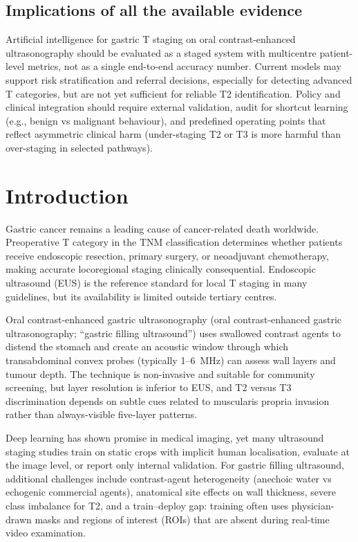 \documentclass[11pt,a4paper]{article}
\begin{document}
\subsection*{Implications of all the available evidence}
Artificial intelligence for gastric T staging on oral contrast-enhanced ultrasonography should be evaluated as a staged system with multicentre patient-level metrics, not as a single end-to-end accuracy number. Current models may support risk stratification and referral decisions, especially for detecting advanced T categories, but are not yet sufficient for reliable T2 identification. Policy and clinical integration should require external validation, audit for shortcut learning (e.g., benign vs malignant behaviour), and predefined operating points that reflect asymmetric clinical harm (under-staging T2 or T3 is more harmful than over-staging in selected pathways).

\section{Introduction}
Gastric cancer remains a leading cause of cancer-related death worldwide. Preoperative T category in the TNM classification determines whether patients receive endoscopic resection, primary surgery, or neoadjuvant chemotherapy, making accurate locoregional staging clinically consequential.\cite{ajcc8,china_gastric_guideline2022} Endoscopic ultrasound (EUS) is the reference standard for local T staging in many guidelines, but its availability is limited outside tertiary centres.\cite{eus_staging_review}

Oral contrast-enhanced gastric ultrasonography (oral contrast-enhanced gastric ultrasonography; ``gastric filling ultrasound'') uses swallowed contrast agents to distend the stomach and create an acoustic window through which transabdominal convex probes (typically 1--6~MHz) can assess wall layers and tumour depth.\cite{oral_contrast_expert2020} The technique is non-invasive and suitable for community screening, but layer resolution is inferior to EUS, and T2 versus T3 discrimination depends on subtle cues related to muscularis propria invasion rather than always-visible five-layer patterns.

Deep learning has shown promise in medical imaging, yet many ultrasound staging studies train on static crops with implicit human localisation, evaluate at the image level, or report only internal validation.\cite{deeplearning_medical_imaging,prospective_ai_validation} For gastric filling ultrasound, additional challenges include contrast-agent heterogeneity (anechoic water vs echogenic commercial agents), anatomical site effects on wall thickness, severe class imbalance for T2, and a train--deploy gap: training often uses physician-drawn masks and regions of interest (ROIs) that are absent during real-time video examination.
\end{document}
